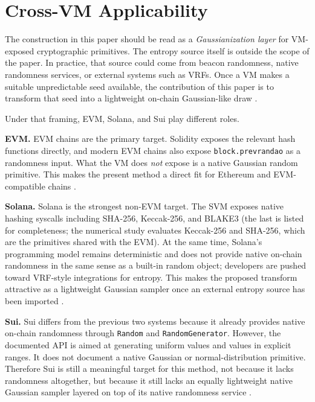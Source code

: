 \documentclass[11pt]{article}
\begin{document}
\section{Cross-VM Applicability}

The construction in this paper should be read as a \emph{Gaussianization layer}
for VM-exposed cryptographic primitives. The entropy source itself is outside
the scope of the paper. In practice, that source could come from beacon
randomness, native randomness services, or external systems such as VRFs. Once a
VM makes a suitable unpredictable seed available, the contribution of this
paper is to transform that seed into a lightweight on-chain Gaussian-like draw
\citep{ChainlinkVRF,EIP4399,SuiRandomnessDocs}.

Under that framing, EVM, Solana, and Sui play different roles.

\textbf{EVM.} EVM chains are the primary target. Solidity exposes the relevant
hash functions directly, and modern EVM chains also expose
\texttt{block.prevrandao} as a randomness input. What the VM does \emph{not}
expose is a native Gaussian random primitive. This makes the present method a
direct fit for Ethereum and EVM-compatible chains
\citep{SolidityGlobals,EIP4399}.

\textbf{Solana.} Solana is the strongest non-EVM target. The SVM exposes native
hashing syscalls including SHA-256, Keccak-256, and BLAKE3 (the last is listed
for completeness; the numerical study evaluates Keccak-256 and SHA-256, which
are the primitives shared with the EVM). At the same time,
Solana's programming model remains deterministic and does not provide native
on-chain randomness in the same sense as a built-in random object; developers
are pushed toward VRF-style integrations for entropy. This makes the proposed
transform attractive as a lightweight Gaussian sampler once an external entropy
source has been imported \citep{SolanaSyscalls,SolanaVRFDocs}.

\textbf{Sui.} Sui differs from the previous two systems because it already
provides native on-chain randomness through \texttt{Random} and
\texttt{RandomGenerator}. However, the documented API is aimed at generating
uniform values and values in explicit ranges. It does not document a native
Gaussian or normal-distribution primitive. Therefore Sui is still a meaningful
target for this method, not because it lacks randomness altogether, but because
it still lacks an equally lightweight native Gaussian sampler layered on top of
its native randomness service \citep{SuiRandomnessDocs}.
\end{document}
